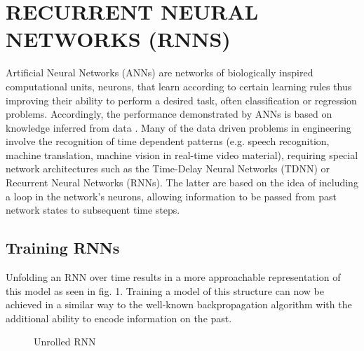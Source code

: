 \documentclass[letterpaper, 10 pt, conference]{ieeeconf}  %
\begin{document}
\section{RECURRENT NEURAL NETWORKS (RNNS)}
Artificial Neural Networks (ANNs) are networks of biologically inspired computational units, neurons, that learn 
according to certain learning rules thus improving their ability to perform a desired task, often classification or regression 
problems. Accordingly, the performance demonstrated by ANNs is based on knowledge inferred from data \cite{schusterBidirectionalRecurrentNeural1997}.
Many of the data driven problems in engineering involve the recognition of time dependent patterns (e.g. speech
recognition, machine translation, machine vision in real-time video material), requiring special
network architectures such as the Time-Delay Neural Networks (TDNN) \cite{waibelPhonemeRecognitionUsing1989} or Recurrent Neural Networks (RNNs). 
The latter are based on the idea of including a loop in the network's neurons, allowing information to be passed 
from past network states to subsequent time steps. 

\subsection{Training RNNs}
Unfolding an RNN over time results in a more approachable representation of this model as seen in fig. 1. Training a 
model of this structure can now be achieved in a similar way to the well-known backpropagation algorithm with the additional 
ability to encode information on the past\cite{werbosBackpropagationTimeWhat1990}. 
\begin{figure}[thpb]
        \centering
  \caption{Unrolled RNN \cite{UnderstandingLSTMNetworks}}
        \label{figurelabel}
     \end{figure}
\end{document}
